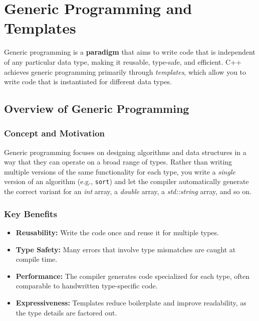 \section{Generic Programming and Templates}

Generic programming is a \textbf{paradigm} that aims to write code that is independent of any particular data type, making it reusable, type-safe, and efficient. C++ achieves generic programming primarily through \emph{templates}, which allow you to write code that is instantiated for different data types.

\subsection{Overview of Generic Programming}
\subsubsection{Concept and Motivation}
Generic programming focuses on designing algorithms and data structures in a way that they can operate on a broad range of types. Rather than writing multiple versions of the same functionality for each type, you write a \emph{single} version of an algorithm (e.g., \texttt{sort}) and let the compiler automatically generate the correct variant for an \textit{int} array, a \textit{double} array, a \textit{std::string} array, and so on.

\subsubsection{Key Benefits}
\begin{itemize}
    \item \textbf{Reusability:} Write the code once and reuse it for multiple types.
    \item \textbf{Type Safety:} Many errors that involve type mismatches are caught at compile time.
    \item \textbf{Performance:} The compiler generates code specialized for each type, often comparable to handwritten type-specific code.
    \item \textbf{Expressiveness:} Templates reduce boilerplate and improve readability, as the type details are factored out.
\end{itemize}

